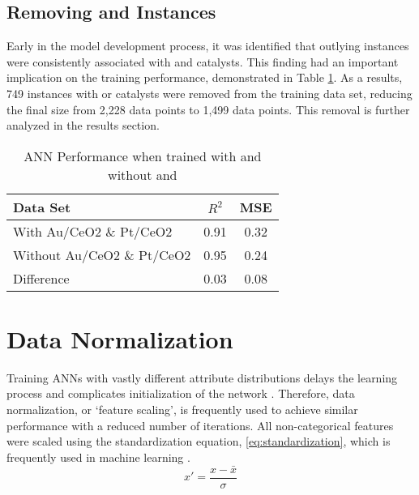 	\subsection{Removing  and  Instances}
	Early in the model development process, it was identified that outlying instances were consistently associated with  and  catalysts. This finding had an important implication on the training performance, demonstrated in Table \ref{table: compare with AuPtCeO2}. As a results, 749 instances with  or  catalysts were removed from the training data set, reducing the final size from 2,228 data points to 1,499 data points. This removal is further analyzed in the results section.
	\begin{table}[ht]
			\centering
			\caption{ANN Performance when trained with and without  and }
			\label{table: compare with AuPtCeO2}
			\begin{tabular}{l|cc}
				\textbf{Data Set}          & \textbf{$R^2$} & \textbf{MSE} \\ \hline
				With Au/CeO2 \& Pt/CeO2    & 0.91                  & 0.32         \\
				Without Au/CeO2 \& Pt/CeO2 & 0.95                  & 0.24         \\
				Difference                 & 0.03                  & 0.08        
				\end{tabular}
				\end{table}
\section{Data Normalization}
Training ANNs with vastly different attribute distributions delays the learning process and complicates initialization of the network \cite{Ioffe_2015}. Therefore, data normalization, or `feature scaling', is frequently used to achieve similar performance with a reduced number of iterations. All non-categorical features were scaled using the standardization equation, \ref{eq:standardization}, which is frequently used in machine learning \cite{Grus_2015}.
		\begin{equation}
			x' = \frac{x - \bar{x}}{\sigma}\label{eq:standardization}\end{equation}

